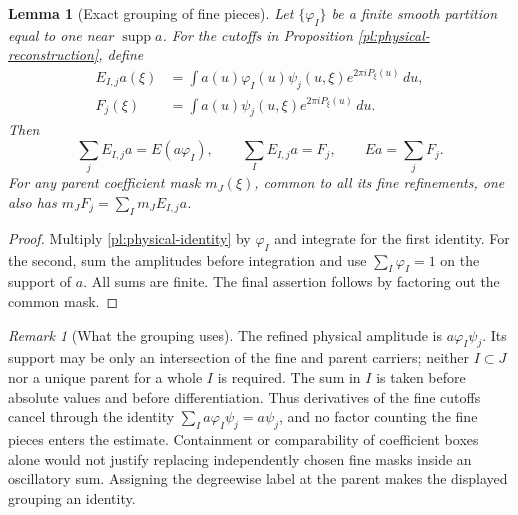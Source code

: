 \documentclass[11pt]{amsart}
\newtheorem{lemma}[theorem]{Lemma}
\theoremstyle{definition}
\theoremstyle{remark}
\newtheorem{remark}[theorem]{Remark}
\numberwithin{equation}{section}
\begin{document}
\begin{lemma}[Exact grouping of fine pieces]\label{pl:exact-grouping}
Let $\{\varphi_I\}$ be a finite smooth partition equal to one near $\operatorname{supp}a$. For the cutoffs in Proposition \ref{pl:physical-reconstruction}, define
\begin{equation}\label{pl:fine-parent-integral}
\begin{split}
E_{I,j}a(\xi)&=\int a(u)\varphi_I(u)\psi_j(u,\xi)e^{2\pi iP_\xi(u)}\,du,\\
F_j(\xi)&=\int a(u)\psi_j(u,\xi)e^{2\pi iP_\xi(u)}\,du.
\end{split}
\end{equation}
Then
\begin{equation}\label{pl:grouping-identities}
\sum_jE_{I,j}a=E(a\varphi_I),\qquad
\sum_IE_{I,j}a=F_j,\qquad
Ea=\sum_jF_j.
\end{equation}
For any parent coefficient mask $m_J(\xi)$, common to all its fine refinements, one also has $m_JF_j=\sum_I m_JE_{I,j}a$.
\end{lemma}

\begin{proof}
Multiply \eqref{pl:physical-identity} by $\varphi_I$ and integrate for the first identity. For the second, sum the amplitudes before integration and use $\sum_I\varphi_I=1$ on the support of $a$. All sums are finite. The final assertion follows by factoring out the common mask.
\end{proof}

\begin{remark}[What the grouping uses]\label{pl:grouping-remark}
The refined physical amplitude is $a\varphi_I\psi_j$. Its support may be only an intersection of the fine and parent carriers; neither $I\subset J$ nor a unique parent for a whole $I$ is required. The sum in $I$ is taken before absolute values and before differentiation. Thus derivatives of the fine cutoffs cancel through the identity $\sum_I a\varphi_I\psi_j=a\psi_j$, and no factor counting the fine pieces enters the estimate. Containment or comparability of coefficient boxes alone would not justify replacing independently chosen fine masks inside an oscillatory sum. Assigning the degreewise label at the parent makes the displayed grouping an identity.
\end{remark}
\end{document}
